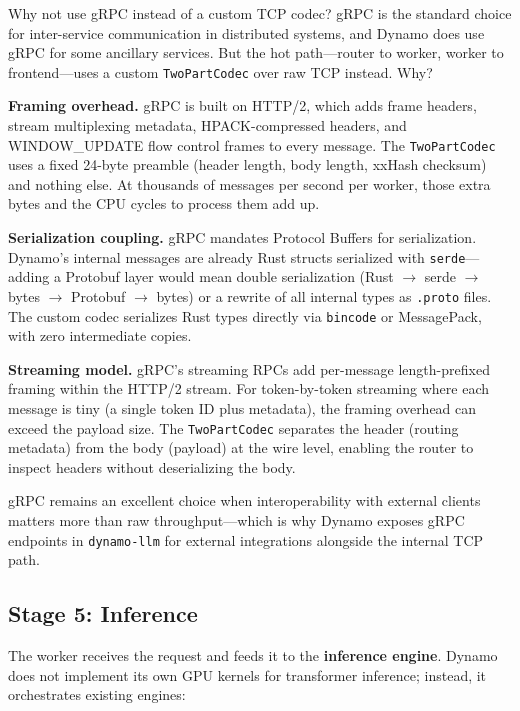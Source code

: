 \begin{whynotbox}{Why not use gRPC instead of a custom TCP codec?}
gRPC is the standard choice for inter-service communication in distributed systems, and Dynamo does use gRPC for some ancillary services. But the hot path---router to worker, worker to frontend---uses a custom \texttt{TwoPartCodec} over raw TCP instead. Why?

\textbf{Framing overhead.} gRPC is built on HTTP/2, which adds frame headers, stream multiplexing metadata, HPACK-compressed headers, and WINDOW\_UPDATE flow control frames to every message. The \texttt{TwoPartCodec} uses a fixed 24-byte preamble (header length, body length, xxHash checksum) and nothing else. At thousands of messages per second per worker, those extra bytes and the CPU cycles to process them add up.

\textbf{Serialization coupling.} gRPC mandates Protocol Buffers for serialization. Dynamo's internal messages are already Rust structs serialized with \texttt{serde}---adding a Protobuf layer would mean double serialization (Rust $\to$ serde $\to$ bytes $\to$ Protobuf $\to$ bytes) or a rewrite of all internal types as \texttt{.proto} files. The custom codec serializes Rust types directly via \texttt{bincode} or MessagePack, with zero intermediate copies.

\textbf{Streaming model.} gRPC's streaming RPCs add per-message length-prefixed framing within the HTTP/2 stream. For token-by-token streaming where each message is tiny (a single token ID plus metadata), the framing overhead can exceed the payload size. The \texttt{TwoPartCodec} separates the header (routing metadata) from the body (payload) at the wire level, enabling the router to inspect headers without deserializing the body.

gRPC remains an excellent choice when interoperability with external clients matters more than raw throughput---which is why Dynamo exposes gRPC endpoints in \texttt{dynamo-llm} for external integrations alongside the internal TCP path.
\end{whynotbox}

\subsection{Stage 5: Inference}

The worker receives the request and feeds it to the \textbf{inference engine}. Dynamo does not implement its own GPU kernels for transformer inference; instead, it orchestrates existing engines:

